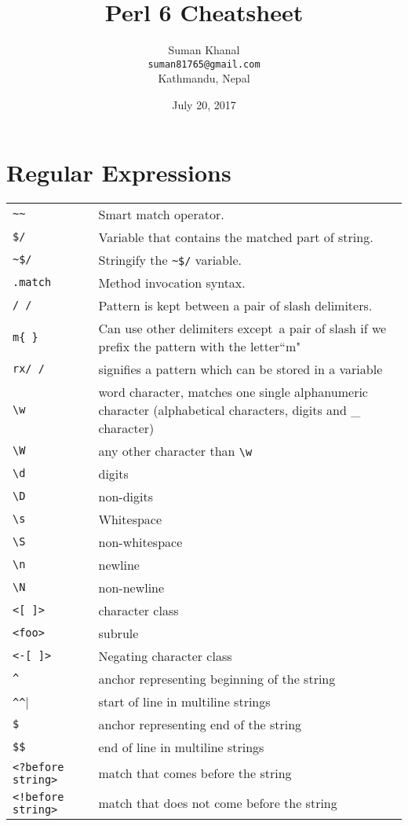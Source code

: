 \documentclass{article}
\title{\huge\textbf{Perl 6 Cheatsheet}}
\author{Suman Khanal \\ \texttt{suman81765@gmail.com}\\ Kathmandu, Nepal}
\date{July 20, 2017}
\begin{document}
	\maketitle
	\section{Regular Expressions}
	\begin{tabular}{ll}
		\verb!~~!   & Smart match operator. \\
		\verb!$/!  & Variable that contains the matched part of string. \\
		\verb!~$/! & Stringify the \verb!~$/! variable. \\
		\verb!.match!  & Method invocation syntax. \\
		\verb!/ /!  & Pattern is kept between a pair of slash delimiters.\\
		\verb|m{ }|	& Can use other delimiters except\ a pair of slash if we prefix the pattern with the letter``m"\\
		\verb|rx/ /| & 	signifies a pattern which can be stored in a variable\\
		\verb|\w| &	word character, matches one single alphanumeric character (alphabetical characters, digits and \_ character)\\		
		\verb|\W|	& any other character than \verb|\w|\\
		\verb|\d|	& digits\\
		\verb|\D|	& non-digits\\
		\verb|\s|	& Whitespace\\
		\verb|\S|	& non-whitespace\\
		\verb|\n|	& newline\\
		\verb|\N|	& non-newline\\
		\verb|<[ ]>|	& character class\\
		\verb|<foo>| & subrule\\
		\verb|<-[ ]>|	& Negating character class\\
		\verb|^|	& anchor representing beginning of the string\\
		\verb|^^|	& start of line in multiline strings\\
		\verb|$|	& anchor representing end of the string\\
		\verb|$$|	& end of line in multiline strings\\
		\verb|<?before string>|	& match that comes before the string\\
		\verb|<!before string>|	& match that does not come before the string\\

\end{tabular}
\end{document}
